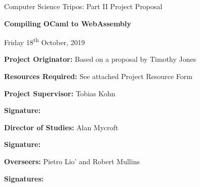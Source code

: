 \thispagestyle{empty}
	
	
	\vfil
	
	\centerline{\large Computer Science Tripos: Part II Project Proposal}
	\vspace{0.4in}
	\centerline{\Large\bf Compiling OCaml to WebAssembly}
	\vspace{0.3in}
	\centerline{\large{Friday 18\textsuperscript{th} October, 2019}}
	
	\vfil
	
	{\bf Project Originator:} Based on a proposal by Timothy Jones
	
	\vspace{0.1in}
	
	{\bf Resources Required:} See attached Project Resource Form
	
	\vspace{0.5in}
	
	{\bf Project Supervisor:} Tobias Kohn
	
	\vspace{0.2in}
	
	{\bf Signature:}
	
	\vspace{0.5in}
	
	{\bf Director of Studies:}  Alan Mycroft
	
	\vspace{0.2in}
	
	{\bf Signature:}
	
	\vspace{0.5in}
	
	{\bf Overseers:} Pietro Lio' and Robert Mullins
	
	\vspace{0.2in}
	
	{\bf Signatures:} 
	
	\vfil
	\eject
	
	

